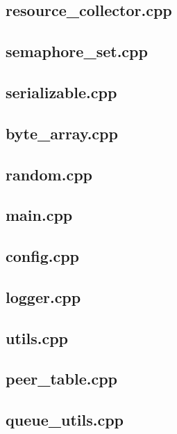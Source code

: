 \subsection*{resource_collector.cpp}
\scriptsize
\subsection*{semaphore_set.cpp}
\scriptsize
\subsection*{serializable.cpp}
\scriptsize
\subsection*{byte_array.cpp}
\scriptsize
\subsection*{random.cpp}
\scriptsize
\subsection*{main.cpp}
\scriptsize
\subsection*{config.cpp}
\scriptsize
\subsection*{logger.cpp}
\scriptsize
\subsection*{utils.cpp}
\scriptsize
\subsection*{peer_table.cpp}
\scriptsize
\subsection*{queue_utils.cpp}
\scriptsize
